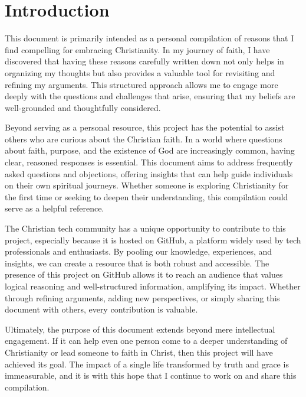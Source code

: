 \section*{Introduction}
This document is primarily intended as a personal compilation of reasons that I find compelling for embracing Christianity. 
In my journey of faith, I have discovered that having these reasons carefully written down not only helps in organizing my thoughts but also provides a valuable tool for revisiting and refining my arguments. 
This structured approach allows me to engage more deeply with the questions and challenges that arise, ensuring that my beliefs are well-grounded and thoughtfully considered.

Beyond serving as a personal resource, this project has the potential to assist others who are curious about the Christian faith. 
In a world where questions about faith, purpose, and the existence of God are increasingly common, having clear, reasoned responses is essential. 
This document aims to address frequently asked questions and objections, offering insights that can help guide individuals on their own spiritual journeys. 
Whether someone is exploring Christianity for the first time or seeking to deepen their understanding, this compilation could serve as a helpful reference.

The Christian tech community has a unique opportunity to contribute to this project, especially because it is hosted on GitHub, a platform widely used by tech professionals and enthusiasts. 
By pooling our knowledge, experiences, and insights, we can create a resource that is both robust and accessible. 
The presence of this project on GitHub allows it to reach an audience that values logical reasoning and well-structured information, amplifying its impact. 
Whether through refining arguments, adding new perspectives, or simply sharing this document with others, every contribution is valuable.
 
Ultimately, the purpose of this document extends beyond mere intellectual engagement. 
If it can help even one person come to a deeper understanding of Christianity or lead someone to faith in Christ, then this project will have achieved its goal. 
The impact of a single life transformed by truth and grace is immeasurable, and it is with this hope that I continue to work on and share this compilation.

